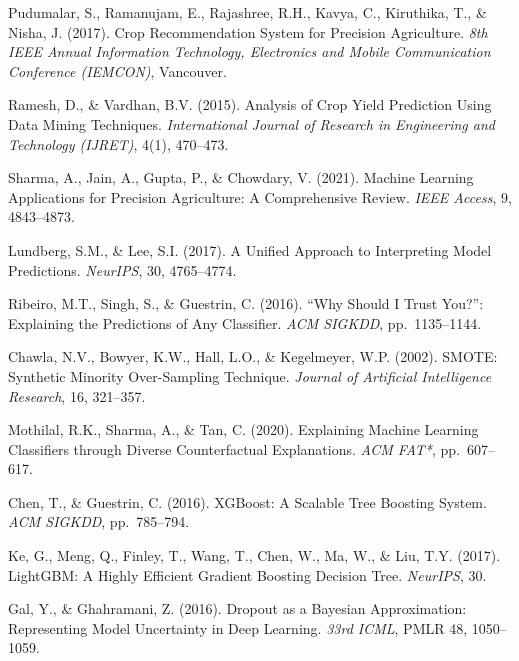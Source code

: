 \documentclass[12pt,a4paper,oneside]{report}
\begin{document}
\begin{singlespacing}
\begin{enumerate}[leftmargin=*, label={[\arabic*]}]

\item Pudumalar, S., Ramanujam, E., Rajashree, R.H., Kavya, C., Kiruthika, T., \& Nisha, J. (2017). Crop Recommendation System for Precision Agriculture. \textit{8th IEEE Annual Information Technology, Electronics and Mobile Communication Conference (IEMCON)}, Vancouver.

\item Ramesh, D., \& Vardhan, B.V. (2015). Analysis of Crop Yield Prediction Using Data Mining Techniques. \textit{International Journal of Research in Engineering and Technology (IJRET)}, 4(1), 470--473.

\item Sharma, A., Jain, A., Gupta, P., \& Chowdary, V. (2021). Machine Learning Applications for Precision Agriculture: A Comprehensive Review. \textit{IEEE Access}, 9, 4843--4873.

\item Lundberg, S.M., \& Lee, S.I. (2017). A Unified Approach to Interpreting Model Predictions. \textit{NeurIPS}, 30, 4765--4774.

\item Ribeiro, M.T., Singh, S., \& Guestrin, C. (2016). ``Why Should I Trust You?'': Explaining the Predictions of Any Classifier. \textit{ACM SIGKDD}, pp.\ 1135--1144.

\item Chawla, N.V., Bowyer, K.W., Hall, L.O., \& Kegelmeyer, W.P. (2002). SMOTE: Synthetic Minority Over-Sampling Technique. \textit{Journal of Artificial Intelligence Research}, 16, 321--357.

\item Mothilal, R.K., Sharma, A., \& Tan, C. (2020). Explaining Machine Learning Classifiers through Diverse Counterfactual Explanations. \textit{ACM FAT*}, pp.\ 607--617.

\item Chen, T., \& Guestrin, C. (2016). XGBoost: A Scalable Tree Boosting System. \textit{ACM SIGKDD}, pp.\ 785--794.

\item Ke, G., Meng, Q., Finley, T., Wang, T., Chen, W., Ma, W., \& Liu, T.Y. (2017). LightGBM: A Highly Efficient Gradient Boosting Decision Tree. \textit{NeurIPS}, 30.

\item Gal, Y., \& Ghahramani, Z. (2016). Dropout as a Bayesian Approximation: Representing Model Uncertainty in Deep Learning. \textit{33rd ICML}, PMLR 48, 1050--1059.


\end{enumerate}
\end{singlespacing}
\end{document}
